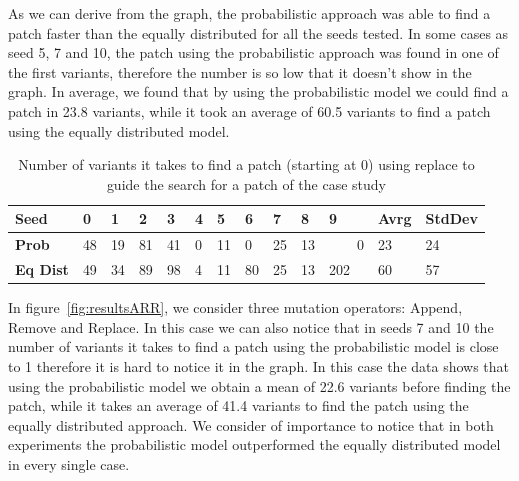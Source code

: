 \documentclass[conference]{IEEEtran}
\begin{document}
As we can derive from the graph, the probabilistic approach was able to find a 
patch faster than the equally distributed for all the seeds tested. In some 
cases as seed 5, 7 and 10, the patch using the probabilistic approach was found 
in one of the first variants, therefore the number is so low that it doesn't 
show in the graph. In average, we found that by using the probabilistic model we 
could find a patch in 23.8 variants, while it took an average of 60.5 variants 
to find a patch using the equally distributed model.

\begin{table}[ht]
\begin{tabular}{lR{0.1cm}R{0.1cm}R{0.1cm}R{0.1cm}R{0.1cm}R{0.1cm}R{0.1cm}R{0.1cm}R{0.1cm}R{0.1cm}R{0.5cm}R{0.5cm}}
\hline
\textbf{Seed} & \textbf{0} & \textbf{1} & \textbf{2} & \textbf{3} & \textbf{4} & \textbf{5} & \textbf{6} & \textbf{7} & \textbf{8} & \textbf{9} & Avrg & StdDev  \\
\hline
\textbf{Prob} & 48 & 19 & 81 & 41 & 0 & 11 & 0 & 25 & 13 & ~~~~0 & 23 & 24 \\

\textbf{Eq Dist} & 49 & 34 & 89 & 98 & 4 & 11 & 80 & 25 & 13 & 202 & 60 & 57\\
\hline
\end{tabular}
%
\center
  \caption{Number of variants it takes to find a patch (starting at 0) using replace to guide the search for a patch of the case study}
  \label{fig:resultsReplace}
\end{table} 


In figure~\ref{fig:resultsARR}, we consider three mutation operators: Append, 
Remove and Replace. In this case we can also notice that in seeds 7 and 10 the 
number of variants it takes to find a patch using the probabilistic model is 
close to 1 therefore it is hard to notice it in the graph. In this case the data 
shows that using the probabilistic model we obtain a mean of 22.6 variants 
before finding the patch, while it takes an average of 41.4 variants to find the 
patch using the equally distributed approach. We consider of importance to notice that in both experiments the probabilistic model outperformed the equally distributed model in every single case.
\end{document}
